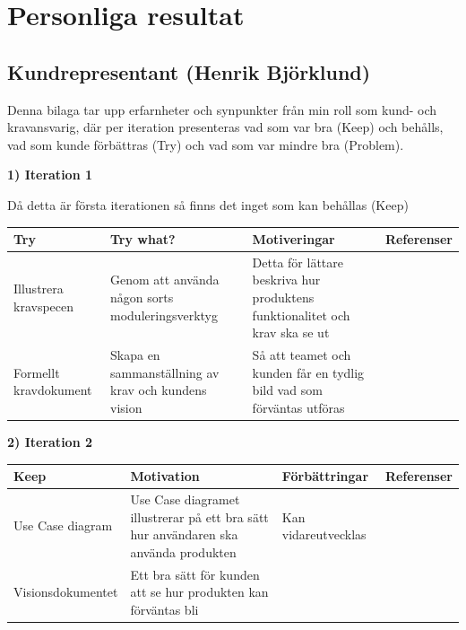 \documentclass[conference,a4paper]{IEEEtran}
\newcommand\Tstrut{\rule{0pt}{2.6ex}}       %
\newcommand\Bstrut{\rule[-0.9ex]{0pt}{0pt}} %
\newcommand{\TBstrut}{\Tstrut\Bstrut} %
\begin{document}




\appendices
\section{Personliga resultat}

\subsection{Kundrepresentant (Henrik Björklund)}
Denna bilaga tar upp erfarnheter och synpunkter från min roll som kund- och kravansvarig, där per iteration presenteras vad som var bra (Keep) och behålls, vad som kunde förbättras (Try) och vad som var mindre bra (Problem).

\textbf{1) Iteration 1}

Då detta är första iterationen så finns det inget som kan behållas (Keep)

\begin{table}[H]
	\small
  \centering
	\begin{tabular}{|p{1.5cm}|p{2cm}|p{1.8cm}|p{1.5cm}|} %
    \hline
    Try & Try what? & Motiveringar & Referenser \TBstrut \\
    \hline
     Illustrera kravspecen & Genom att använda någon sorts moduleringsverktyg & Detta för lättare beskriva hur produktens funktionalitet och krav ska se ut  & \TBstrut \\
    \hline
     Formellt kravdokument & Skapa en sammanställning av krav och kundens vision & Så att teamet och kunden får en tydlig bild vad som förväntas utföras  & \TBstrut \\
    \hline 
  \end{tabular}
\end{table}

\textbf{2) Iteration 2}

\begin{table}[H]
	\small
  \centering
	\begin{tabular}{|p{1.5cm}|p{2cm}|p{1.8cm}|p{1.5cm}|} %
    \hline
    Keep & Motivation & Förbättringar & Referenser \TBstrut \\
    \hline
   Use Case diagram & Use Case diagramet illustrerar på ett bra sätt hur användaren ska använda produkten & Kan vidareutvecklas & \cite{Jacobson11} \TBstrut \\
    \hline
    Visionsdokumentet & Ett bra sätt för kunden att se hur produkten kan förväntas bli &  & \cite{Sommerville10} \TBstrut \\
    \hline
  \end{tabular}
\end{table}
\end{document}

